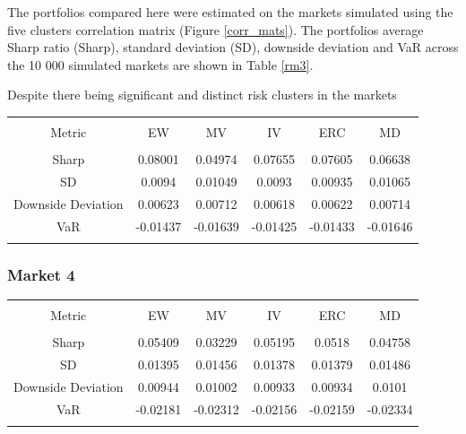 \documentclass[11pt,preprint, authoryear]{elsarticle}
\let\origtable\table
\let\endorigtable\endtable
\renewenvironment{table}[1][2] {
    \expandafter\origtable\expandafter[H]
} {
    \endorigtable
}
\numberwithin{equation}{section}
\numberwithin{figure}{section}
\numberwithin{table}{section}
\begin{document}
The portfolios compared here were estimated on the markets simulated
using the five clusters correlation matrix (Figure \ref{corr_mats}). The
portfolios average Sharp ratio (Sharp), standard deviation (SD),
downside deviation and VaR across the 10 000 simulated markets are shown
in Table \ref{rm3}.

Despite there being significant and distinct risk clusters in the
markets

\begin{table}[!htbp] \centering 
  \caption{Market 3 Risk Metrics} 
  \label{rm3} 
\begin{tabular}{@{\extracolsep{5pt}} cccccc} 
\\[-1.8ex]\hline 
\hline \\[-1.8ex] 
Metric & EW & MV & IV & ERC & MD \\ 
\hline \\[-1.8ex] 
Sharp & 0.08001 & 0.04974 & 0.07655 & 0.07605 & 0.06638 \\ 
SD & 0.0094 & 0.01049 & 0.0093 & 0.00935 & 0.01065 \\ 
Downside Deviation & 0.00623 & 0.00712 & 0.00618 & 0.00622 & 0.00714 \\ 
VaR & -0.01437 & -0.01639 & -0.01425 & -0.01433 & -0.01646 \\ 
\hline \\[-1.8ex] 
\end{tabular} 
\end{table}

\hypertarget{market-4}{%
\subsubsection{Market 4}\label{market-4}}

\begin{table}[!htbp] \centering 
  \caption{Market 4 Risk Metrics} 
  \label{eigens} 
\begin{tabular}{@{\extracolsep{5pt}} cccccc} 
\\[-1.8ex]\hline 
\hline \\[-1.8ex] 
Metric & EW & MV & IV & ERC & MD \\ 
\hline \\[-1.8ex] 
Sharp & 0.05409 & 0.03229 & 0.05195 & 0.0518 & 0.04758 \\ 
SD & 0.01395 & 0.01456 & 0.01378 & 0.01379 & 0.01486 \\ 
Downside Deviation & 0.00944 & 0.01002 & 0.00933 & 0.00934 & 0.0101 \\ 
VaR & -0.02181 & -0.02312 & -0.02156 & -0.02159 & -0.02334 \\ 
\hline \\[-1.8ex] 
\end{tabular} 
\end{table}
\end{document}
